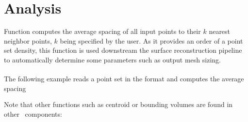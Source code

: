 \section{Analysis}

Function  computes the average spacing of all input points to their $k$ nearest neighbor points, $k$ being specified by the user. As it provides an order of a point set density, this function is used downstream the surface reconstruction pipeline to automatically determine some parameters such as output mesh sizing. \\
 \\

The following example reads a point set in the  format and computes the average spacing

Note that other functions such as centroid or bounding volumes are found in other \cgal\ components: \\
  \\
  \\
  \\

